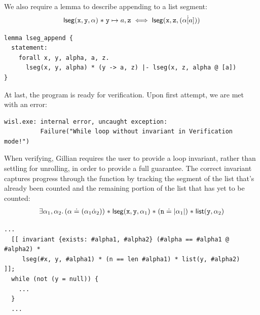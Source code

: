 We also require a lemma to describe appending to a list segment:
\begin{align*}
    \mathsf{lseg}(\mathtt{x}, \mathtt{y}, \alpha) \mathrel{*} \mathtt{y} \mapsto a, \mathtt{z} \iff \mathsf{lseg}(\mathtt{x}, \mathtt{z}, (\alpha \dot [a]))
\end{align*}

\begin{lstlisting}[style=code, numbers=none, caption={List segment lemma in WISL}]
lemma lseg_append {
  statement:
    forall x, y, alpha, a, z.
      lseg(x, y, alpha) * (y -> a, z) |- lseg(x, z, alpha @ [a])
}
\end{lstlisting}

At last, the program is ready for verification. Upon first attempt, we are met with an error:
\begin{lstlisting}[style=code, numbers=none, caption={Attempted verification - no loop invariant}]
wisl.exe: internal error, uncaught exception:
          Failure("While loop without invariant in Verification mode!")
\end{lstlisting}

When verifying, Gillian requires the user to provide a loop invariant, rather
than settling for unrolling, in order to provide a full guarantee. The correct
invariant captures progress through the function by tracking the segment of the
list that's already been counted and the remaining portion of the list that has
yet to be counted:
\begin{align*}
    \exists \alpha_1, \alpha_2 \ldotp (\alpha \doteq (\alpha_1 \dot \alpha_2)) \mathrel{*} \mathsf{lseg}(\mathtt{x}, \mathtt{y}, \alpha_1) \mathrel{*} (\mathtt{n} \doteq | \alpha_1 |) \mathrel{*} \mathsf{list}(\mathtt{y}, \alpha_2)
\end{align*}

\begin{lstlisting}[style=code, numbers=none, caption={WISL list length - loop invariant}]
  ...
  [[ invariant {exists: #alpha1, #alpha2} (#alpha == #alpha1 @ #alpha2) * 
     lseg(#x, y, #alpha1) * (n == len #alpha1) * list(y, #alpha2)         ]];
  while (not (y = null)) {
    ...
  }
  ...
\end{lstlisting}

